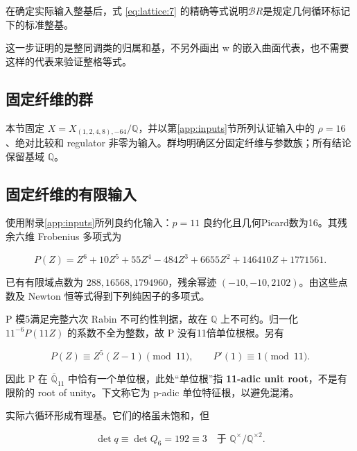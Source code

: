 \documentclass[11pt,a4paper,oneside]{ctexart}
\theoremstyle{cnplain}
\theoremstyle{definition}
\theoremstyle{remark}
\newcommand{\Q}{\mathbb Q}
\numberwithin{equation}{section}
\begin{document}
在确定实际输入整基后，式 \eqref{eq:lattice:7} 的精确等式说明\(\mathcal B R\)是规定几何循环标记下的标准整基。

这一步证明的是整同调类的归属和基，不另外画出 w 的嵌入曲面代表，也不需要这样的代表来验证整格等式。



\endgroup

\subsection*{固定纤维的群}

\begingroup

本节固定 $X=X_{(1,2,4,8),-64}/\Q$，并以第\ref{app:inputs}节所列认证输入中的 $\rho=16$、绝对比较和 regulator 非零为输入。群均明确区分固定纤维与参数族；所有结论保留基域 $\Q$。

\subsection{固定纤维的有限输入}\label{sec:fixed:1}

使用附录\ref{app:inputs}所列良约化输入：\(p=11\) 良约化且几何Picard数为16。其残余六维 Frobenius 多项式为

\begin{equation}
P(Z)=Z^6+10Z^5+55Z^4-484Z^3+6655Z^2+146410Z+1771561.             \label{eq:fixed:3}
\end{equation}

已有有限域点数为 \(288,16568,1794960\)，残余幂迹 \((-10,-10,2102)\)。由这些点数及 Newton 恒等式得到下列纯因子的多项式。

P 模5满足完整六次 Rabin 不可约性判据，故在 \(\mathbb Q\) 上不可约。归一化 \(11^{-6}P(11Z)\) 的系数不全为整数，故 P 没有11倍单位根根。另有

\begin{equation}
P(Z)\equiv Z^5(Z-1)\pmod {11},\qquad P'(1)\equiv1\pmod {11}.     \label{eq:fixed:4}
\end{equation}

因此 P 在 \(\overline{\mathbb Q}_{11}\) 中恰有一个单位根，此处``单位根''指 \textbf{11-adic unit root}，不是有限阶的 root of unity。下文称它为 p-adic 单位特征根，以避免混淆。

实际六循环形成有理基。它们的格虽未饱和，但

\begin{equation}
\det q\equiv\det Q_6=192\equiv3
 \quad\text{于 }\mathbb Q^\times/\mathbb Q^{\times2}.             \label{eq:fixed:5}
\end{equation}
\end{document}

